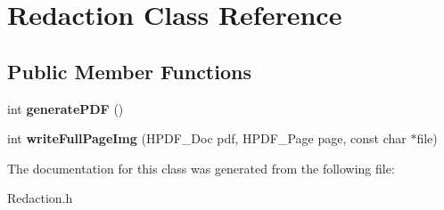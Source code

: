 \hypertarget{classRedaction}{}\section{Redaction Class Reference}
\label{classRedaction}
\subsection*{Public Member Functions}
\begin{DoxyCompactItemize}
\item 
\mbox{\label{classRedaction_a4659115b2df63c9e0694c7f7cf325ff6}} 
int {\bfseries generate\+P\+DF} ()
\item 
\mbox{\label{classRedaction_a4b1cec4c2a80f6b429d588db48e03e50}} 
int {\bfseries write\+Full\+Page\+Img} (H\+P\+D\+F\+\_\+\+Doc pdf, H\+P\+D\+F\+\_\+\+Page page, const char $\ast$file)
\end{DoxyCompactItemize}


The documentation for this class was generated from the following file\+:\begin{DoxyCompactItemize}
\item 
Redaction.\+h\end{DoxyCompactItemize}
